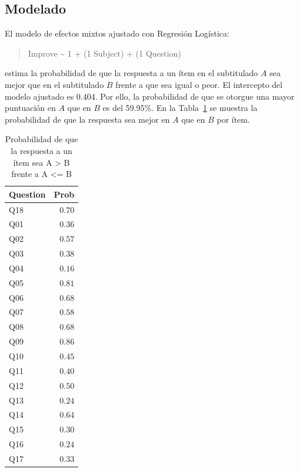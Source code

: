 \documentclass[
  12pt,
  a4paper,
  extrafontsizes,
  onecolumn,
  openright,
  table]{memoir}
\begin{document}
\hypertarget{modelado}{%
\subsection{Modelado}\label{modelado}}

El modelo de efectos mixtos ajustado con Regresión Logística:

\begin{quote}
Improve \textasciitilde{} 1 + (1 \textbar{} Subject) + (1 \textbar{}
Question)
\end{quote}

estima la probabilidad de que la respuesta a un ítem en el subtitulado
\(A\) sea mejor que en el subtitulado \(B\) frente a que sea igual o
peor. El intercepto del modelo ajustado es 0.404. Por ello, la
probabilidad de que se otorgue una mayor puntuación en \(A\) que en
\(B\) es del 59.95\%. En la Tabla~\ref{tbl-improve-question} se muestra
la probabilidad de que la respuesta sea mejor en \(A\) que en \(B\) por
ítem.

\scriptsize

\hypertarget{tbl-improve-question}{}
\begin{longtable}{lr}
\caption{\label{tbl-improve-question}Probabilidad de que la respuesta a un ítem sea A \textgreater{} B frente
a A \textless= B }\tabularnewline

\toprule
Question & Prob \\ 
\midrule
Q18 & $0.70$ \\ 
Q01 & $0.36$ \\ 
Q02 & $0.57$ \\ 
Q03 & $0.38$ \\ 
Q04 & $0.16$ \\ 
Q05 & $0.81$ \\ 
Q06 & $0.68$ \\ 
Q07 & $0.58$ \\ 
Q08 & $0.68$ \\ 
Q09 & $0.86$ \\ 
Q10 & $0.45$ \\ 
Q11 & $0.40$ \\ 
Q12 & $0.50$ \\ 
Q13 & $0.24$ \\ 
Q14 & $0.64$ \\ 
Q15 & $0.30$ \\ 
Q16 & $0.24$ \\ 
Q17 & $0.33$ \\ 
\bottomrule
\end{longtable}
\end{document}
